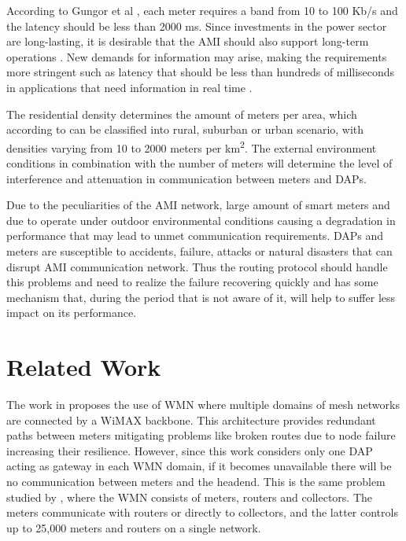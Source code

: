 \documentclass[conference]{IEEEtran}
\begin{document}
According to Gungor et al \cite{Gungor2013}, each meter requires a band from 10 to 100 Kb/s and the latency should be less than 2000 ms. Since investments in the power sector are long-lasting, it is desirable that the AMI should also support long-term operations \cite{5484223}. New demands for information may arise, making the requirements more stringent such as latency that should be less than hundreds of milliseconds in applications that need information in real time \cite{5484223,Yan2013}.


The residential density determines the amount of meters per area, which according to \cite{Plan2011} can be classified into rural, suburban or urban scenario, with densities varying from 10 to 2000 meters per km\textsuperscript{2}. The external environment conditions in combination with the number of meters will determine the level of interference and attenuation in communication between meters and DAPs.



Due to the peculiarities of the AMI network, large amount of smart meters and due to operate under outdoor environmental conditions causing a degradation in performance that may lead to unmet communication requirements. DAPs and meters are susceptible to accidents, failure, attacks or natural disasters that can disrupt AMI communication network. Thus the routing protocol should handle this problems and need to realize the failure recovering quickly and has some mechanism that, during the period that is not aware of it, will help to suffer less impact on its performance.




\section{Related Work}

The work in \cite{Gungor2006}  proposes the use of WMN where multiple domains of mesh networks are connected by a WiMAX backbone. This architecture provides redundant paths between meters mitigating problems like broken routes due to node failure increasing their resilience. However, since this work considers only one DAP acting as gateway in each WMN domain, if it becomes unavailable there will be no communication between meters and the headend. This is the same problem studied by \cite{5622071}, where the WMN consists of meters, routers and collectors. The meters communicate with routers or directly to collectors, and the latter controls up to 25,000 meters and routers on a single network.
\end{document}
